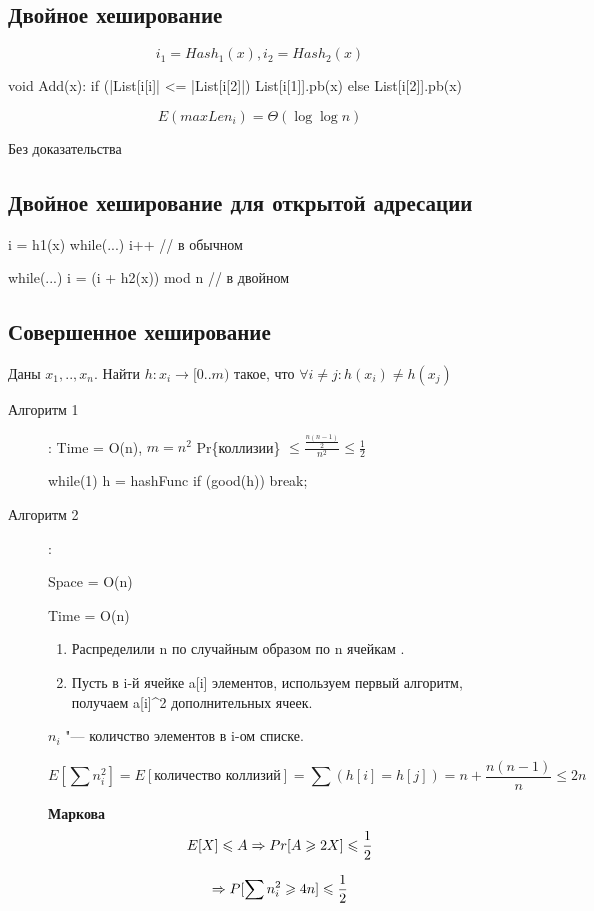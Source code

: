 \subsection{Двойное хеширование}
$$i_1 = Hash_1(x), i_2 = Hash_2(x)$$
\begin{cppcode}
void Add(x):
    if (|List[i[i]| <= |List[i[2]|) {
        List[i[1]].pb(x)
    } else {
        List[i[2]].pb(x)
    }
\end{cppcode}

\begin{lemma}{}
 $$E(max Len_i) = \Theta(\log \log n)$$
 
 Без доказательства
\end{lemma}


\subsection{Двойное хеширование для открытой адресации}

\begin{cppcode}
i = h1(x)
while(...) i++  // в обычном 

while(...) i = (i + h2(x)) mod n // в двойном
\end{cppcode}

\subsection{Совершенное хеширование} 

Даны $x_1,..,x_n$. Найти $h\colon x_i\rightarrow [0..m)$ такое, что  $\forall i \neq j\colon h(x_i) \neq h(x_j)$
\begin{description}
\item[Алгоритм 1]: Time = O(n), $m = n^2$
Pr\{коллизии\} $\le \frac{\frac{n(n-1)}{2}}{n^2} \le \frac{1}{2}$

\begin{cppcode}
while(1) {
    h = hashFunc
    if (good(h)) {
        break;
    }
}
\end{cppcode}

\item[Алгоритм 2]: 

Space = O(n)

Time = O(n)

\begin{enumerate}
\item Распределили n по случайным образом по n ячейкам . 
\item  Пусть в i-й ячейке a[i] элементов, используем первый алгоритм, 
получаем a[i]^2 дополнительных ячеек. 
\end{enumerate}

$n_i$ "--- количство элементов в i-ом списке.

$$E[\sum n_i^2] = E[\text{количество коллизий}] = \sum(h[i] = h[j]) = n + \frac{n(n - 1)}{n} \le 2n$$

\begin{lemma}{\bf Маркова}
$$E[X] \leqslant A \Rightarrow Pr[A \geqslant 2X] \leqslant \frac{1}{2}$$
\end{lemma}

$$\Rightarrow P[\sum n_i^2 \geqslant 4n] \leqslant \frac{1}{2}$$
\end{description} 


